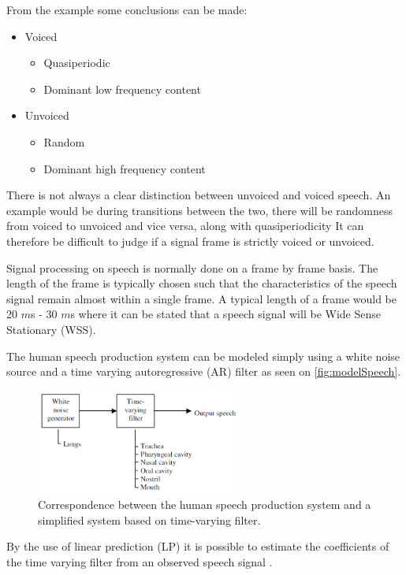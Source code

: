 \newpage

From the example some conclusions can be made:
\begin{itemize}
\item Voiced
	\begin{itemize}
	\item Quasiperiodic
	\item Dominant low frequency content
	\end{itemize}
\item Unvoiced
	\begin{itemize}
	\item Random 
	\item Dominant high frequency content
	\end{itemize}
\end{itemize}


There is not always a clear distinction between unvoiced and voiced speech. An example would be during transitions between the two, there will be randomness from voiced to unvoiced and vice versa, along with quasiperiodicity It can therefore be difficult to judge if a signal frame is strictly voiced or unvoiced. 

Signal processing on speech is normally done on a frame by frame basis. The length of the frame is typically chosen such that the characteristics of the speech signal remain almost within a single frame. A typical length of a frame would be 20 $m$s - 30 $m$s where it can be stated that a speech signal will be Wide Sense Stationary (WSS).  

The human speech production system can be modeled simply using a white noise source and a time varying autoregressive (AR) filter as seen on \autoref{fig:modelSpeech}. 

\begin{figure}[H]
	\centering
	\includegraphics[width=0.6\textwidth]{figures/Speech/modelSpeech}
	\caption{Correspondence between the human speech production system and a simplified system based on time-varying filter.}
	\label{fig:modelSpeech}
\end{figure}      

By the use of linear prediction (LP) it is possible to estimate the coefficients of the time varying filter from an observed speech signal 
\citep{Speech}.


